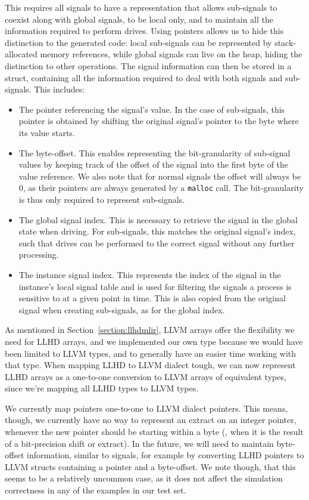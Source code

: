 This requires all signals to have a representation that allows sub-signals to coexist along with global signals, to be local only, and to maintain all the information required to perform drives. Using pointers allows us to hide this distinction to the generated code: local sub-signals can be represented by stack-allocated memory references, while global signals can live on the heap, hiding the distinction to other operations. The signal information can then be stored in a struct, containing all the information required to deal with both signals and sub-signals. This includes:

\begin{itemize}
    \item The pointer referencing the signal's value. In the case of sub-signals, this pointer is obtained by shifting the original signal's pointer to the byte where its value starts.
    \item The byte-offset. This enables representing the bit-granularity of sub-signal values by keeping track of the offset of the signal into the first byte of the value reference. We also note that for normal signals the offset will always be $0$, as their pointers are always generated by a \texttt{malloc} call. The bit-granularity is thus only required to represent sub-signals.
    \item The global signal index. This is necessary to retrieve the signal in the global state when driving. For sub-signals, this matches the original signal's index, such that drives can be performed to the correct signal without any further processing.
    \item The instance signal index. This represents the index of the signal in the instance's local signal table and is used for filtering the signals a process is sensitive to at a given point in time. This is also copied from the original signal when creating sub-signals, as for the global index.
\end{itemize}

As mentioned in Section~\ref{section:llhdmlir}, LLVM arrays offer the flexibility we need for LLHD arrays, and we implemented our own type because we would have been limited to LLVM types, and to generally have an easier time working with that type. When mapping LLHD to LLVM dialect tough, we can now represent LLHD arrays as a one-to-one conversion to LLVM arrays of equivalent types, since we're mapping all LLHD types to LLVM types.

We currently map pointers one-to-one to LLVM dialect pointers. This means, though, we currently have no way to represent an extract on an integer pointer, whenever the new pointer should be starting within a byte (\ie, when it is the result of a bit-precision shift or extract). In the future, we will need to maintain byte-offset information, similar to signals, for example by converting LLHD pointers to LLVM structs containing a pointer and a byte-offset. We note though, that this seems to be a relatively uncommon case, as it does not affect the simulation correctness in any of the examples in our test set.

